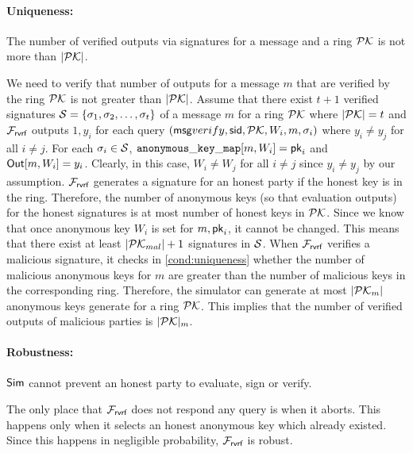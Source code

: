\paragraph{Uniqueness:} The number of verified outputs via signatures for a message and a ring $ {\mathcal{PK}} $ is not more than $ |{\mathcal{PK}}| $.
 
 We need to verify that number of outputs for a message $ m $ that are verified by the ring $ {\mathcal{PK}} $ is not greater than $ |{\mathcal{PK}}| $.
Assume that there exist $ t + 1 $ verified signatures $ {\mathcal{S}} = \{\sigma_1, \sigma_2, \ldots, \sigma_t\} $ of a message $ m $ for a ring $ {\mathcal{PK}} $ where $ |{\mathcal{PK}}| = t $ and $ \mathcal{F}_{\textsf{rvrf}} $ outputs $ 1, y_i $ for each query $ (\mathsf{msg}{verify}, \textsf{sid}, {\mathcal{PK}}, W_i, m, \sigma_i) $ where $ y_i \neq y_j $ for all $ i \neq j $. For each $ \sigma_i \in {\ensuremath{\mathcal{S}}} $, $ \mathtt{anonymous\_key\_map}[m,W_i] = \mathsf{pk}_i $ and $ {\mathsf{Out}}[m,W_i] = y_i $. Clearly, in this case, $ W_i \neq W_j $ for all $ i \neq j $ since $ y_i \neq y_j $ by our assumption. $ \mathcal{F}_{\textsf{rvrf}} $ generates a signature for an honest party if the honest key is in the ring. Therefore, the number of anonymous keys (so that evaluation outputs) for the honest signatures is at most number of honest keys in $ {\mathcal{PK}} $. Since we know that once anonymous key $ W_i $ is set for $ m, \mathsf{pk}_i $, it cannot be changed. This means that there exist at least $ |{\mathcal{PK}}_{mal}| + 1 $ signatures in $ {\mathcal{S}} $. When $ \mathcal{F}_{\textsf{rvrf}} $ verifies a malicious signature, it checks in \ref{cond:uniqueness} whether the number of malicious anonymous keys for $ m $ are greater than the number of malicious keys in the corresponding ring. Therefore, the simulator can generate at most $ |{\mathcal{PK}}_m| $ anonymous keys generate for a ring $ {\mathcal{PK}} $. This implies that the number of verified outputs of malicious parties   is $ |{\mathcal{PK}}|_m $. 

\paragraph{Robustness:} $ \mathsf{Sim} $ cannot prevent an honest party to evaluate, sign or verify.

The only place that $ \mathcal{F}_{\textsf{rvrf}} $ does not respond any query is when it aborts. This happens only when it selects an honest anonymous key which already existed. Since this happens in negligible probability,  $ \mathcal{F}_{\textsf{rvrf}} $ is robust.


